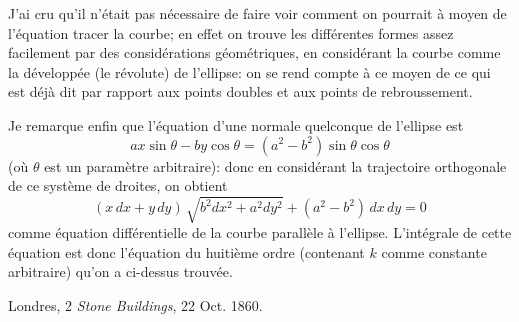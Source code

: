 \documentclass[11pt,a4paper]{book}
\begin{document}
J'ai cru qu'il n'\'{e}tait pas n\'{e}cessaire de faire voir comment on pourrait \`{a} moyen de l'\'{e}quation tracer la courbe; en effet on trouve les diff\'{e}rentes formes assez facilement par des consid\'{e}rations g\'{e}om\'{e}triques, en consid\'{e}rant la courbe comme la d\'{e}velopp\'{e}e (le r\'{e}volute) de l'ellipse: on se rend compte \`{a} ce moyen de ce qui est d\'{e}j\`{a} dit par rapport aux points doubles et aux points de rebroussement.

Je remarque enfin que l'\'{e}quation d'une normale quelconque de l'ellipse est
\[
ax\sin\theta - by\cos\theta = (a^2-b^2)\sin\theta\cos\theta
\]
(o\`{u} $\theta$ est un param\`{e}tre arbitraire): donc en consid\'{e}rant la trajectoire orthogonale de ce syst\`{e}me de droites, on obtient
\[
(x\,dx + y\,dy)\,\sqrt{b^2dx^2+a^2dy^2} + (a^2-b^2)\,dx\,dy = 0
\]
comme \'{e}quation diff\'{e}rentielle de la courbe parall\`{e}le \`{a} l'ellipse. L'int\'{e}grale de cette \'{e}quation est donc l'\'{e}quation du huiti\`{e}me ordre (contenant $k$ comme constante arbitraire) qu'on a ci-dessus trouv\'{e}e.

\begin{flushright}
Londres, 2 \textit{Stone Buildings}, 22 Oct. 1860.
\end{flushright}


\end{document}
